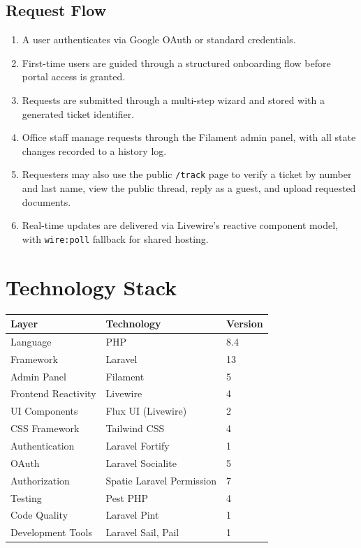 \documentclass[12pt,a4paper]{article}
\newcommand{\code}[1]{\texttt{#1}}
\begin{document}
\subsection*{Request Flow}
\begin{enumerate}
    \item A user authenticates via Google OAuth or standard credentials.
    \item First-time users are guided through a structured onboarding flow before portal access is granted.
    \item Requests are submitted through a multi-step wizard and stored with a generated ticket identifier.
    \item Office staff manage requests through the Filament admin panel, with all state changes recorded to a history log.
    \item Requesters may also use the public \code{/track} page to verify a ticket by number and last name, view the public thread, reply as a guest, and upload requested documents.
    \item Real-time updates are delivered via Livewire's reactive component model, with \code{wire:poll} fallback for shared hosting.
\end{enumerate}

\section{Technology Stack}

\begin{table}[h]
\centering
\begin{tabularx}{\textwidth}{@{} l Y l @{}}
\toprule
\textbf{Layer} & \textbf{Technology} & \textbf{Version} \\
\midrule
Language & PHP & 8.4 \\
Framework & Laravel & 13 \\
Admin Panel & Filament & 5 \\
Frontend Reactivity & Livewire & 4 \\
UI Components & Flux UI (Livewire) & 2 \\
CSS Framework & Tailwind CSS & 4 \\
Authentication & Laravel Fortify & 1 \\
OAuth & Laravel Socialite & 5 \\
Authorization & Spatie Laravel Permission & 7 \\
Testing & Pest PHP & 4 \\
Code Quality & Laravel Pint & 1 \\
Development Tools & Laravel Sail, Pail & 1 \\
\bottomrule
\end{tabularx}
\end{table}
\end{document}
